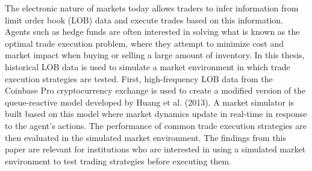 The electronic nature of markets today allows traders to infer information from limit order book (LOB) data and execute trades based on this information. Agents such as hedge funds are often interested in solving what is known as the optimal trade execution problem, where they attempt to minimize cost and market impact when buying or selling a large amount of inventory. In this thesis, historical LOB data is used to simulate a market environment in which trade execution strategies are tested. First, high-frequency LOB data from the Coinbase Pro cryptocurrency exchange is used to create a modified version of the queue-reactive model developed by Huang et al. (2013). A market simulator is built based on this model where market dynamics update in real-time in response to the agent's actions. The performance of common trade execution strategies are then evaluated in the simulated market environment. The findings from this paper are relevant for institutions who are interested in using a simulated market environment to test trading strategies before executing them.